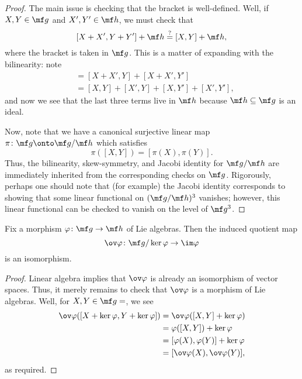 \documentclass[../notes.tex]{subfiles}
\begin{document}
\begin{proof}
	The main issue is checking that the bracket is well-defined. Well, if $X,Y\in\mf g$ and $X',Y'\in\mf h$, we must check that
	\[[X+X',Y+Y']+\mf h\stackrel?=[X,Y]+\mf h,\]
	where the bracket is taken in $\mf g$. This is a matter of expanding with the bilinearity: note
	\begin{align*}
		[X+X',Y+Y'] &= [X+X',Y]+[X+X',Y'] \\
		&= [X,Y]+[X',Y]+[X,Y']+[X',Y'],
	\end{align*}
	and now we see that the last three terms live in $\mf h$ because $\mf h\subseteq\mf g$ is an ideal.

	Now, note that we have a canonical surjective linear map $\pi\colon\mf g\onto\mf g/\mf h$ which satisfies
	\[\pi([X,Y])=[\pi(X),\pi(Y)].\]
	Thus, the bilinearity, skew-symmetry, and Jacobi identity for $\mf g/\mf h$ are immediately inherited from the corresponding checks on $\mf g$. Rigorously, perhaps one should note that (for example) the Jacobi identity corresponds to showing that some linear functional on $(\mf g/\mf h)^3$ vanishes; however, this linear functional can be checked to vanish on the level of $\mf g^3$.
\end{proof}
\begin{proposition}
	Fix a morphism $\varphi\colon\mf g\to\mf h$ of Lie algebras. Then the induced quotient map
	\[\ov\varphi\colon\mf g/\ker\varphi\to\im\varphi\]
	is an isomorphism.
\end{proposition}
\begin{proof}
	Linear algebra implies that $\ov\varphi$ is already an isomorphism of vector spaces. Thus, it merely remains to check that $\ov\varphi$ is a morphism of Lie algebras. Well, for $X,Y\in\mf g=$, we see
	\begin{align*}
		\ov\varphi([X+\ker\varphi,Y+\ker\varphi]) &= \ov\varphi([X,Y]+\ker\varphi) \\
		&= \varphi([X,Y])+\ker\varphi \\
		&= [\varphi(X),\varphi(Y)]+\ker\varphi \\
		&= [\ov\varphi(X),\ov\varphi(Y)],
	\end{align*}
	as required.
\end{proof}
\end{document}
